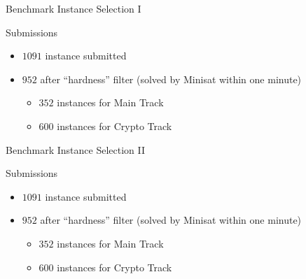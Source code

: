 \documentclass{beamer}
\begin{document}
\begin{frame}{Benchmark Instance Selection I}

\begin{block}{Submissions}
\begin{itemize}
\item $1091$ instance submitted
\item $952$ after ``hardness'' filter (solved by Minisat within one minute)
	\begin{itemize}
	\item $352$ instances for Main Track
	\item $600$ instances for Crypto Track
	\end{itemize}
\end{itemize}
\end{block}

\end{frame}

\begin{frame}{Benchmark Instance Selection II}

\begin{block}{Submissions}
\begin{itemize}
\item $1091$ instance submitted
\item $952$ after ``hardness'' filter (solved by Minisat within one minute)
	\begin{itemize}
	\item $352$ instances for Main Track
	\item $600$ instances for Crypto Track
	\end{itemize}
\end{itemize}
\end{block}

\end{frame}
\end{document}
